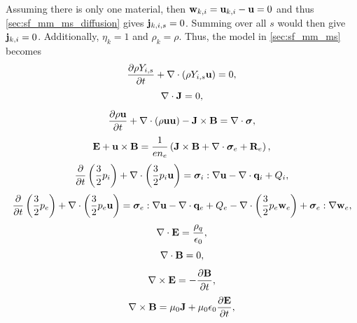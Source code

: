 \documentclass[a4paper,11pt]{report}
\begin{document}
Assuming there is only one material, then $\mathbf{w}_{k,i} = \mathbf{u}_{k,i} - \mathbf{u} = 0$ and thus \cref{sec:sf_mm_ms_diffusion} gives $\mathbf{j}_{k,i,s} = 0$.  Summing over all $s$ would then give $\mathbf{j}_{k,i} = 0$. Additionally, $\eta_k=1$ and $\rho_k = \rho$. Thus, the model in \cref{sec:sf_mm_ms} becomes
\begin{equation}
    \label{eq:sf_sm_ms_ni}
    \frac{\partial \rho Y_{i,s}}{\partial t} + \nabla \cdot \left( \rho Y_{i,s} \mathbf{u} \right) = 0,
\end{equation}
\begin{equation}
    \label{eq:sf_sm_ms_ne}
    \nabla \cdot \mathbf{J} = 0,
\end{equation}
\begin{equation}
    \label{eq:sf_sm_ms_ui}
    \frac{\partial \rho \mathbf{u}}{\partial t} + \nabla \cdot \left( \rho \mathbf{u} \mathbf{u} \right) - \mathbf{J} \times \mathbf{B} = \nabla \cdot \bm \sigma,
\end{equation}
\begin{equation}
    \label{eq:sf_sm_ms_ue}
    \mathbf{E} + \mathbf{u} \times \mathbf{B} = \frac{1}{e n_e} \left( \mathbf{J} \times \mathbf{B} + \nabla \cdot \bm \sigma_e + \mathbf{R}_e \right),
\end{equation}
\begin{equation}
    \label{eq:sf_sm_ms_iei}
    \frac{\partial}{\partial t} \left( \frac{3}{2} p_i \right) + \nabla \cdot \left( \frac{3}{2} p_i \mathbf{u} \right) = \bm \sigma_i : \nabla \mathbf{u} - \nabla \cdot \mathbf{q}_i + Q_i,
\end{equation}
\begin{equation}
    \label{eq:sf_sm_ms_iee}
    \frac{\partial}{\partial t} \left( \frac{3}{2} p_e \right) + \nabla \cdot \left( \frac{3}{2} p_e \mathbf{u} \right) = \bm \sigma_e : \nabla \mathbf{u} - \nabla \cdot \mathbf{q}_e + Q_e - \nabla \cdot \left( \frac{3}{2} p_e \mathbf{w}_e \right) + \bm \sigma_e : \nabla \mathbf{w}_e,
\end{equation}
\begin{equation}
    \label{eq:sf_sm_ms_maxwell_3}
    \nabla \cdot \mathbf{E} = \frac{\rho_q}{\epsilon_0},
\end{equation}
\begin{equation}
    \label{eq:sf_sm_ms_maxwell_4}
    \nabla \cdot \mathbf{B} = 0,
\end{equation}
\begin{equation}
    \label{eq:sf_sm_ms_maxwell_1}
    \nabla \times \mathbf{E} = -\frac{ \partial \mathbf{B}}{\partial t},
\end{equation}
\begin{equation}
    \label{eq:sf_sm_ms_maxwell_2}
    \nabla \times \mathbf{B} = \mu_0 \mathbf{J} + \mu_0 \epsilon_0 \frac{\partial \mathbf{E}}{\partial t},
\end{equation}
\end{document}
